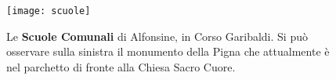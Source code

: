  \begin{figure}[htb]
    \centering
    \texttt{[image: scuole]}
    \caption[Scuole Comunali]{Le \textbf{Scuole Comunali} di Alfonsine, in Corso Garibaldi. Si può osservare sulla sinistra il monumento della Pigna che attualmente è nel parchetto di fronte alla Chiesa Sacro Cuore.\label{fig:scuole}}
\end{figure}



















































%